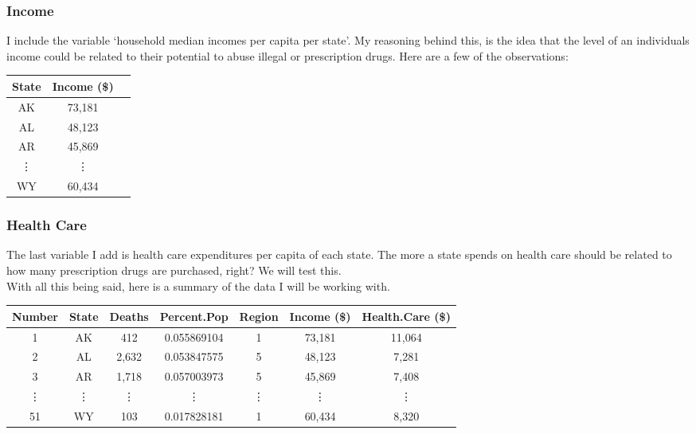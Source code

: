 \documentclass[10pt]{beamer}
\begin{document}
\begin{frame}
\frametitle{Income}
	I include the variable `household median incomes per capita per state'\cite{income}. My reasoning behind this, is the idea that the level of an individuals income could be related to their potential to abuse illegal or prescription drugs. Here are a few of the observations:
		\begin{center}
		\begin{tabular}{|c|c|c}
			\hline
			State & Income (\$)\\
			\hline
			AK & 73,181\\
			\hline
			AL & 48,123\\
			\hline
			AR & 45,869\\
			\hline
			\vdots & \vdots\\
			\hline
			WY & 60,434\\
			\hline
		\end{tabular}
		\end{center}
\end{frame}

\begin{frame}
\frametitle{Health Care}
	The last variable I add is health care expenditures per capita of each state. The more a state spends on health care should be related to how many prescription drugs are purchased, right? We will test this.\\[2mm]
	With all this being said, here is a summary of the data I will be working with.
		\begin{center}
		\begin{adjustbox}{width=\columnwidth,center}
		\begin{tabular}{|c|c|c|c|c|c|c|}
		\hline
		Number & State & Deaths & Percent.Pop & Region & Income (\$) & Health.Care (\$)\\
		\hline
		1 & AK & 412 & 0.055869104 & 1 & 73,181 & 11,064\\
		\hline
		2 & AL & 2,632 & 0.053847575 & 5 & 48,123 & 7,281\\
		\hline
		3 & AR & 1,718 & 0.057003973 & 5 & 45,869 & 7,408\\
		\hline
		\vdots & \vdots & \vdots & \vdots & \vdots & \vdots & \vdots\\
		\hline
		51 & WY & 103 & 0.017828181 & 1 & 60,434 & 8,320\\
		\hline
		\end{tabular}
		\end{adjustbox}
		\end{center}
\end{frame}
\end{document}
